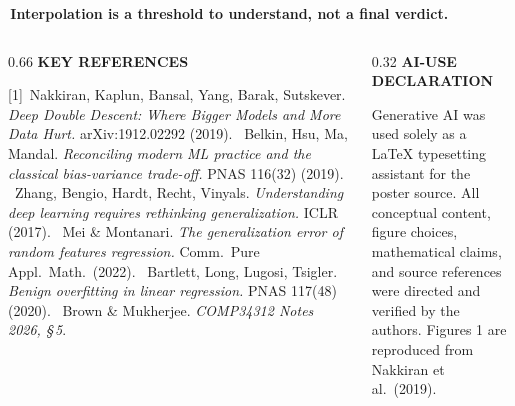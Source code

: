 \documentclass[final]{beamer}
\newcommand{\eyebrow}[1]{{\color{uompurple}\footnotesize\bfseries\MakeUppercase{#1}}\par\vspace{-0.2ex}}
\newcommand{\bigtakeaway}[1]{%
  \par\noindent\colorbox{uompurple}{\parbox{\linewidth-2\fboxsep}{\centering\bfseries\normalsize\color{white}\,#1\,}}\par}
\begin{document}
\begin{frame}[t]{}
\vspace{-0.15cm}
\bigtakeaway{Interpolation is a threshold to understand, not a final verdict.}
\vspace{-0.05cm}

\begin{columns}[T,onlytextwidth]
\begin{column}{0.66\linewidth}
\eyebrow{Key references}\vspace{-0.7ex}
{\scriptsize
[1]~Nakkiran, Kaplun, Bansal, Yang, Barak, Sutskever. \emph{Deep Double Descent: Where Bigger Models and More Data Hurt.} arXiv:1912.02292 (2019). \;
[2]~Belkin, Hsu, Ma, Mandal. \emph{Reconciling modern ML practice and the classical bias-variance trade-off.} PNAS 116(32) (2019). \;
[3]~Zhang, Bengio, Hardt, Recht, Vinyals. \emph{Understanding deep learning requires rethinking generalization.} ICLR (2017). \;
[4]~Mei \& Montanari. \emph{The generalization error of random features regression.} Comm.\ Pure Appl.\ Math.\ (2022). \;
[5]~Bartlett, Long, Lugosi, Tsigler. \emph{Benign overfitting in linear regression.} PNAS 117(48) (2020). \;
[6]~Brown \& Mukherjee. \emph{COMP34312 Notes 2026, \S\,5}.
}
\end{column}
\begin{column}{0.32\linewidth}
\eyebrow{AI-use declaration}\vspace{-0.5ex}
{\scriptsize
Generative AI was used solely as a \LaTeX{} typesetting assistant for the poster source. All conceptual content, figure choices, mathematical claims, and source references were directed and verified by the authors. Figures 1 are reproduced from Nakkiran et al.\ (2019).
}
\end{column}
\end{columns}

\end{frame}
\end{document}
